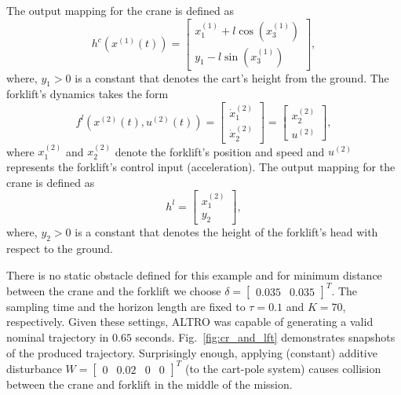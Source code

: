 The output mapping for the crane is defined as
\[
h^c(x^{(1)}(t))=\begin{bmatrix}
	x_1^{(1)}+l \cos(x_3^{(1)})\\
	y_1-l \sin(x_3^{(1)})
\end{bmatrix},
\]
where, $y_1>0$ is a constant that denotes the cart's height from the ground.
The forklift's dynamics takes the form
\[f^{l}(x^{(2)}(t),u^{(2)}(t))=\begin{bmatrix}
\dot{x}_1^{(2)}\\ \dot{x}^{(2)}_2 \end{bmatrix}=\begin{bmatrix} x^{(2)}_2\\ u^{(2)} \end{bmatrix},
\]
where $x_1^{(2)}$ and $x_2^{(2)}$ denote the forklift's position and speed and $u^{(2)}$ represents the forklift's control input (acceleration). The output mapping for the crane is defined as
\[
h^l=\begin{bmatrix}
	x_1^{(2)}\\
	y_2
\end{bmatrix},
\]
where, $y_2>0$ is a constant that denotes the height of the forklift's head with respect to the ground.

There is no static obstacle defined for this example and for minimum distance between the crane and the forklift we choose $\delta=\begin{bmatrix}0.035&0.035\end{bmatrix}^T$. The sampling time and the horizon length are fixed to $\tau=0.1$ and $K=70$, respectively. Given these settings, ALTRO was capable of generating a valid nominal trajectory in $0.65$ seconds. Fig.~\ref{fig:cr_and_lft} demonstrates snapshots of the produced trajectory. Surprisingly enough, applying (constant) additive disturbance $W=\begin{bmatrix}0&0.02&0&0\end{bmatrix}^T$ (to the cart-pole system) causes collision between the crane and forklift in the middle of the mission.

